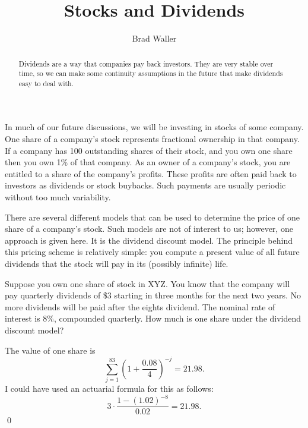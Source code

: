 \documentclass{ximera}
\author{Brad Waller}
\title{Stocks and Dividends}
\begin{document}
\begin{abstract}
Dividends are a way that companies pay back investors. They are very stable over time, so we can make some continuity assumptions in the future that make dividends easy to deal with.
\end{abstract}

\maketitle

In much of our future discussions, we will be investing in stocks of some company. One share of a company's stock represents fractional ownership in that company. If a company has 100 outstanding shares of their stock, and you own one share then you own 1\% of that company. As an owner of a company's stock, you are entitled to a share of the company's profits. These profits are often paid back to investors as dividends or stock buybacks. Such payments are usually periodic without too much variability. 

There are several different models that can be used to determine the price of one share of a company's stock. Such models are not of interest to us; however, one approach is given here. It is the dividend discount model. The principle behind this pricing scheme is relatively simple: you compute a present value of all future dividends that the stock will pay in its (possibly infinite) life. 

\begin{example}
Suppose you own one share of stock in XYZ. You know that the company will pay quarterly dividends of \$3 starting in three months for the next two years. No more dividends will be paid after the eights dividend. The nominal rate of interest is 8\%, compounded quarterly. How much is one share under the dividend discount model?

The value of one share is
	\begin{equation*}
		\sum_{j=1}^83\left(1+\frac{0.08}{4}\right)^{-j}=21.98.
	\end{equation*}
I could have used an actuarial formula for this as follows:
	\begin{equation*}
		3\cdot\frac{1-(1.02)^{-8}}{0.02}=21.98.
	\end{equation*}
	\qed
\end{example}
\end{document}
